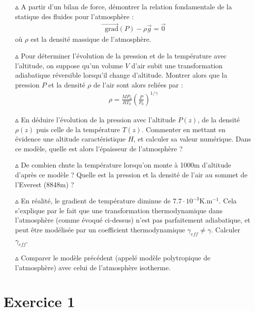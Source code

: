 \documentclass{report}
\newcommand*\grad{\mathop{}\!\mathrm{grad}}
\begin{document}
\begin{itemize}

	\item[$\vartriangle$] A partir d'un bilan de force, démontrer la relation fondamentale de la statique des fluides pour l'atmosphère : 
	\begin{align*}
		\vec{\grad}(P) - \rho\vec{g}=\vec{0}
	\end{align*}
		où $\rho$ est la densité massique de l'atmosphère.
	\item[$\vartriangle$] Pour déterminer l'évolution de la pression et de la température avec l'altitude, on suppose qu'un volume $V$ d'air subit une transformation adiabatique réversible lorsqu'il change d'altitude. Montrer alors que la pression $P$ et la densité $\rho$ de l'air sont alors reliées par :
	\begin{align*}
		\rho = \frac{MP_0}{RT_0}\left(\frac{P}{P_0} \right) ^{1/\gamma}
	\end{align*}

	\item[$\vartriangle$] En déduire l'évolution de la pression avec l'altitude $P(z)$, de la densité $\rho(z)$ puis celle de la température $T(z)$. Commenter en mettant en évidence une altitude caractéristique $H$, et calculer sa valeur numérique. Dans ce modèle, quelle est alors l'épaisseur de l'atmosphère ?
	
	\item[$\vartriangle$] De combien chute la température lorsqu'on monte à 1000m d'altitude d'après ce modèle ? Quelle est la pression et la densité de l'air au sommet de l'Everest (8848m) ?
	
	\item[$\vartriangle$] En réalité, le gradient de température diminue de $7.7\cdot10^{-3}$K.m$^{-1}$. Cela s'explique par le fait que une transformation thermodynamique dans l'atmosphère (comme évoqué ci-dessus) n'est pas parfaitement adiabatique, et peut être modélisée par un coefficient thermodynamique $\gamma_{eff}\neq\gamma$. Calculer $\gamma_{eff}$.
	
	\item[$\vartriangle$] Comparer le modèle précédent (appelé modèle polytropique de l'atmosphère) avec celui de l'atmosphère isotherme.

\end{itemize}

\newpage

\section*{Exercice 1}
\end{document}
